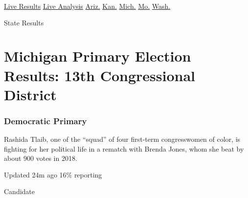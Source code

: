 \href{https://www.nytimes3xbfgragh.onion/interactive/2020/08/04/us/elections/results-arizona-kansas-michigan-missouri-primaries.html?action=click\&module=ELEX_results\&pgtype=Interactive\&region=Navigation}{Live
Results}
\href{https://www.nytimes3xbfgragh.onion/interactive/2020/08/04/us/elections/live-analysis-arizona-kansas-michigan-missouri-primaries.html?action=click\&module=ELEX_results\&pgtype=Interactive\&region=Navigation}{Live
Analysis}
\href{https://www.nytimes3xbfgragh.onion/interactive/2020/08/04/us/elections/results-arizona-primary-elections.html?action=click\&module=ELEX_results\&pgtype=Interactive\&region=Navigation}{Ariz.}
\href{https://www.nytimes3xbfgragh.onion/interactive/2020/08/04/us/elections/results-kansas-primary-elections.html?action=click\&module=ELEX_results\&pgtype=Interactive\&region=Navigation}{Kan.}
\href{https://www.nytimes3xbfgragh.onion/interactive/2020/08/04/us/elections/results-michigan-primary-elections.html?action=click\&module=ELEX_results\&pgtype=Interactive\&region=Navigation}{Mich.}
\href{https://www.nytimes3xbfgragh.onion/interactive/2020/08/04/us/elections/results-missouri-primary-elections.html?action=click\&module=ELEX_results\&pgtype=Interactive\&region=Navigation}{Mo.}
\href{https://www.nytimes3xbfgragh.onion/interactive/2020/08/04/us/elections/results-washington-primary-elections.html?action=click\&module=ELEX_results\&pgtype=Interactive\&region=Navigation}{Wash.}

 State Results

\hypertarget{michigan-primary-election-results-13th-congressional-district-1}{%
\section{Michigan Primary Election Results: 13th Congressional
District}\label{michigan-primary-election-results-13th-congressional-district-1}}

\hypertarget{democratic-primary}{%
\subsubsection{Democratic Primary}\label{democratic-primary}}

Rashida Tlaib, one of the ``squad'' of four first-term congresswomen of
color, is fighting for her political life in a rematch with Brenda
Jones, whom she beat by about 900 votes in 2018.

Updated 24m ago 16\% reporting

Candidate


